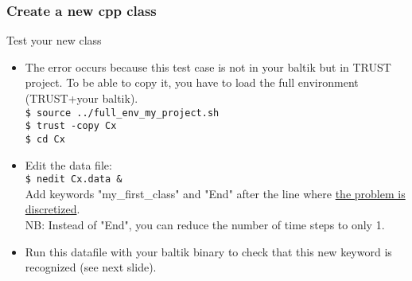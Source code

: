 \documentclass[10pt, hyperref={unicode=true,pdfusetitle, bookmarks=true,bookmarksnumbered=false,bookmarksopen=false, breaklinks=false,pdfborder={0 0 1},backref=true,colorlinks=true,linkcolor=darkblue,pageanchor, urlcolor=darkblue}]{beamer}
\begin{document}
\begin{frame}
\frametitle{Create a new cpp class}
\begin{block}{Test your new class}

\begin{itemize}
\item The error occurs because this test case is not in your baltik but in TRUST project. To be able to copy it, you have to load the full environment (TRUST+your baltik).\\
\texttt{\$ source ../full\_env\_my\_project.sh}\\
\texttt{\$ trust -copy Cx}\\
\texttt{\$ cd Cx}\\

\item Edit the data file:\\
\texttt{\$ nedit Cx.data \&} \\
Add keywords "my\_first\_class" and "End" after the line where \underline{the problem is discretized}.\\
NB: Instead of "End", you can reduce the number of time steps to only 1.\\

\item Run this datafile with your baltik binary to check that this new keyword is recognized (see next slide).
\end{itemize}

\end{block}
\end{frame}
\end{document}
